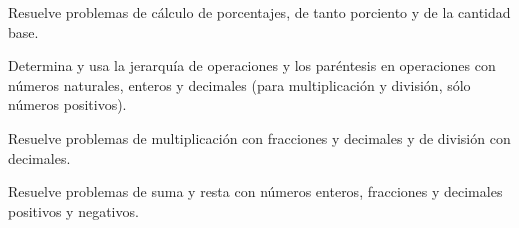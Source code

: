 \item Resuelve problemas de cálculo de porcentajes, de tanto porciento y de la cantidad base.
\item Determina y usa la jerarquía de operaciones y los paréntesis en operaciones con números naturales, enteros y decimales (para multiplicación y división, sólo números positivos).
\item Resuelve problemas de multiplicación con fracciones y decimales y de división con decimales.
\item Resuelve problemas de suma y resta con números enteros, fracciones y decimales positivos y negativos.